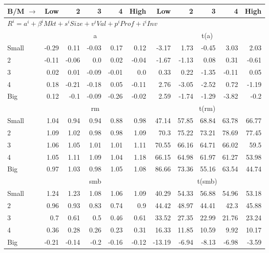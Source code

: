 
\begin{table}[!ht]
\centering
\begin{tabular}{lrrrrrrrrrr}
  \toprule
  B/M $\rightarrow$ & Low & 2 & 3 & 4 & High & Low & 2 & 3 & 4 & High \\ 
  \toprule
  \multicolumn{9}{l}{$R^i=a^i+\beta^iMkt+s^iSize+v^iVal+p^iProf+i^iInv$} \\

  

      & \multicolumn{5}{c}{a} & \multicolumn{5}{c}{t(a)} \\
    \cmidrule(r){2-6} \cmidrule(r){7-11}
      Small  & -0.29  & 0.11  & -0.03  & 0.17  & 0.12   & -3.17  & 1.73  & -0.45  & 3.03  & 2.03  \\
          2  & -0.11  & -0.06  & 0.0  & 0.02  & -0.04   & -1.67  & -1.13  & 0.08  & 0.31  & -0.61  \\
          3  & 0.02  & 0.01  & -0.09  & -0.01  & 0.0   & 0.33  & 0.22  & -1.35  & -0.11  & 0.05  \\
          4  & 0.18  & -0.21  & -0.18  & 0.05  & -0.11   & 2.76  & -3.05  & -2.52  & 0.72  & -1.19  \\
      Big    & 0.12  & -0.1  & -0.09  & -0.26  & -0.02   & 2.59  & -1.74  & -1.29  & -3.82  & -0.2  \\

  

      & \multicolumn{5}{c}{rm} & \multicolumn{5}{c}{t(rm)} \\
    \cmidrule(r){2-6} \cmidrule(r){7-11}
      Small  & 1.04  & 0.94  & 0.94  & 0.88  & 0.98   & 47.14  & 57.85  & 68.84  & 63.78  & 66.77  \\
          2  & 1.09  & 1.02  & 0.98  & 0.98  & 1.09   & 70.3  & 75.22  & 73.21  & 78.69  & 77.45  \\
          3  & 1.06  & 1.05  & 1.01  & 1.01  & 1.11   & 70.55  & 66.16  & 64.71  & 66.02  & 59.5  \\
          4  & 1.05  & 1.11  & 1.09  & 1.04  & 1.18   & 66.15  & 64.98  & 61.97  & 61.27  & 53.98  \\
      Big    & 0.97  & 1.03  & 0.98  & 1.05  & 1.08   & 86.66  & 73.36  & 55.16  & 63.54  & 44.74  \\

  

      & \multicolumn{5}{c}{smb} & \multicolumn{5}{c}{t(smb)} \\
    \cmidrule(r){2-6} \cmidrule(r){7-11}
      Small  & 1.24  & 1.23  & 1.08  & 1.06  & 1.09   & 40.29  & 54.33  & 56.88  & 54.96  & 53.18  \\
          2  & 0.96  & 0.93  & 0.83  & 0.74  & 0.9   & 44.42  & 48.97  & 44.41  & 42.3  & 45.88  \\
          3  & 0.7  & 0.61  & 0.5  & 0.46  & 0.61   & 33.52  & 27.35  & 22.99  & 21.76  & 23.24  \\
          4  & 0.36  & 0.28  & 0.26  & 0.23  & 0.31   & 16.33  & 11.85  & 10.59  & 9.92  & 10.17  \\
      Big    & -0.21  & -0.14  & -0.2  & -0.16  & -0.12   & -13.19  & -6.94  & -8.13  & -6.98  & -3.59  \\


\end{tabular}
\end{table}
